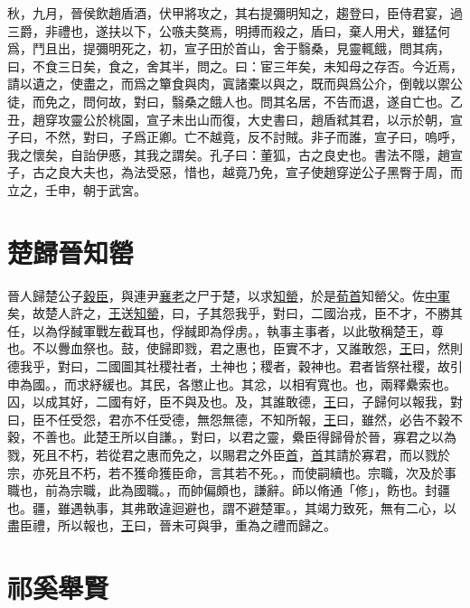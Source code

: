 \documentclass{article}
\newcommand{\tsu}{\small\kaishu\color{brown}}
\begin{document}
秋，九月，晉侯飲趙盾酒，伏甲將攻之，其右提彌明知之，趨登曰，臣侍君宴，過三爵，非禮也，遂扶以下，公嗾夫獒焉，明搏而殺之，盾曰，棄人用犬，雖猛何爲，鬥且出，提彌明死之，初，宣子田於首山，舍于翳桑，見靈輒餓，問其病，曰，不食三日矣，食之，舍其半，問之。曰：宦三年矣，未知母之存否。今近焉，請以遺之，使盡之，而爲之簞食與肉，寘諸橐以與之，既而與爲公介，倒戟以禦公徒，而免之，問何故，對曰，翳桑之餓人也。問其名居，不告而退，遂自亡也。乙丑，趙穿攻靈公於桃園，宣子未出山而復，大史書曰，趙盾弒其君，以示於朝，宣子曰，不然，對曰，子爲正卿。亡不越竟，反不討賊。非子而誰，宣子曰，嗚呼，我之懷矣，自詒伊慼，其我之謂矣。孔子曰：董狐，古之良史也。書法不隱，趙宣子，古之良大夫也，為法受惡，惜也，越竟乃免，宣子使趙穿逆公子黑臀于周，而立之，壬申，朝于武宮。

\section{楚歸晉知罃}

\noindent{\tsu 成公三年}

晉人歸楚公子\uline{穀臣}，與連尹\uline{襄老}之尸于楚，以求\uline{知罃}，於是\uline{荀首}{\tsu 知罃父。}佐\uline{中軍}矣，故楚人許之，\uline{王}送\uline{知罃}，曰，子其怨我乎，對曰，二國治戎，臣不才，不勝其任，以為俘馘{\tsu 軍戰左截耳也，俘馘即為俘虏。}，執事{\tsu 主事者，以此敬稱楚王，尊也。}不以釁{\tsu 血祭也。}鼓，使歸即戮，君之惠也，臣實不才，又誰敢怨，\uline{王}曰，然則德我乎，對曰，二國圖其社稷{\tsu 社者，土神也；稷者，穀神也。君者皆祭社稷，故引申為國。}，而求紓{\tsu 緩也。}其民，各懲{\tsu 止也。}其忿，以相宥{\tsu 寬也。}也，兩釋纍{\tsu 索也。}囚，以成其好，二國有好，臣不與{\tsu 及也。}及，其誰敢德，\uline{王}曰，子歸何以報我，對曰，臣不任受怨，君亦不任受德，無怨無德，不知所報，\uline{王}曰，雖然，必告不穀{\tsu 不穀，不善也。此楚王所以自謙。}，對曰，以君之靈，纍臣得歸骨於晉，寡君之以為戮，死且不朽，若從君之惠而免之，以賜君之外臣\uline{首}，\uline{首}其請於寡君，而以戮於宗，亦死且不朽，若不獲命{\tsu 獲臣命，言其若不死。}，而使嗣{\tsu 續也。}宗職，次及於事{\tsu 職也，前為宗職，此為國職。}，而帥偏{\tsu 頗也，謙辭。}師以脩{\tsu 通「修」，飭也。}封{\tsu 疆也。}疆，雖遇執事，其弗敢違{\tsu 迴避也，謂不避楚軍。}，其竭力致死，無有二心，以盡臣禮，所以報也，\uline{王}曰，晉未可與爭，重為之禮而歸之。

\section{祁奚舉賢}

\noindent{\tsu 襄公三年}
\end{document}
